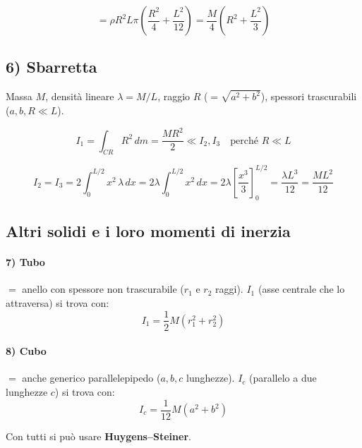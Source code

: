 \begin{equation}
= \rho R^2 L \pi\left(\frac{R^2}{4} + \frac{L^2}{12}\right) = \boxed{\frac{M}{4}\left(R^2 + \frac{L^2}{3}\right)}
\end{equation}

\subsection{6) Sbarretta}

Massa $M$, densità lineare $\lambda = M/L$, raggio $R$ ($= \sqrt{a^2 + b^2}$), spessori trascurabili ($a, b, R \ll L$).


\begin{equation}
\boxed{I_1} = \int_{CR} R^2\,dm = \boxed{\frac{MR^2}{2}} \ll I_2, I_3 \quad \text{perché } R \ll L
\end{equation}

\begin{equation}
\boxed{I_2 = I_3} = 2\int_0^{L/2} x^2\,\lambda\,dx = 2\lambda\int_0^{L/2} x^2\,dx = 2\lambda\left[\frac{x^3}{3}\right]_0^{L/2} = \frac{\lambda L^3}{12} = \boxed{\frac{ML^2}{12}}
\end{equation}

\subsection{Altri solidi e i loro momenti di inerzia}

\paragraph{7) Tubo}
$=$ anello con spessore non trascurabile ($r_1$ e $r_2$ raggi). $I_1$ (asse centrale che lo attraversa) si trova con:
\begin{equation}
I_1 = \frac{1}{2}M(r_1^2 + r_2^2)
\end{equation}

\paragraph{8) Cubo}
$=$ anche generico parallelepipedo ($a, b, c$ lunghezze). $I_c$ (parallelo a due lunghezze $c$) si trova con:
\begin{equation}
I_c = \frac{1}{12}M(a^2 + b^2)
\end{equation}

Con tutti si può usare \textbf{Huygens--Steiner}.
